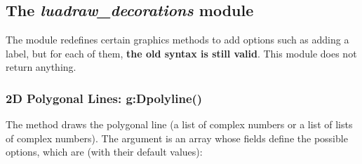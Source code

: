 \subsection{The \emph{luadraw\_decorations} module}

The  module redefines certain graphics methods to add options such as adding a label, but for each of them, \textbf{the old syntax is still valid}. This module does not return anything.

\subsubsection{2D Polygonal Lines: g:Dpolyline()}

The method  draws the polygonal line  (a list of complex numbers or a list of lists of complex numbers). The argument  is an array whose fields define the possible options, which are (with their default values):
